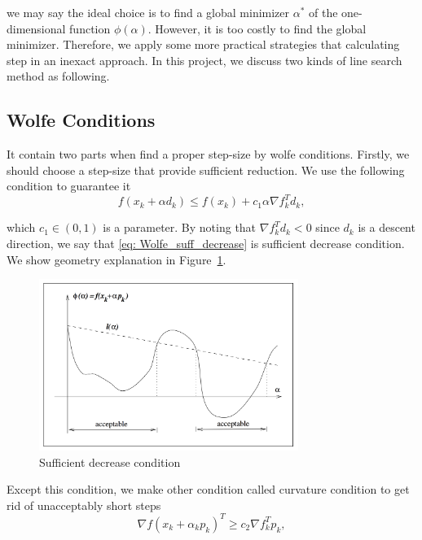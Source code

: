 \documentclass[11pt]{report}
\begin{document}
we may say the ideal choice is to find a global minimizer $\alpha^*$ of the one-dimensional function $\phi(\alpha)$. However, it is too costly to find the global minimizer. Therefore, we apply some more practical strategies that calculating step in an inexact approach. In this project, we discuss two kinds of line search method as following.

\subsection{Wolfe Conditions} %
\label{ssub:wolfe_conditions}

It contain two parts when find a proper step-size by wolfe conditions. Firstly, we should choose a step-size that provide sufficient reduction. We use the following condition to guarantee it
\begin{equation}\label{eq: Wolfe_suff_decrease}
    f(x_k+\alpha d_k) \leq f(x_k) + c_1 \alpha \nabla f_k^Td_k,
\end{equation}

which $c_1\in (0,1)$ is a parameter. By noting that $ \nabla f_k^Td_k<0$ since $d_k$ is a descent direction, we say that \eqref{eq: Wolfe_suff_decrease} is sufficient decrease condition. We show geometry explanation in Figure~\ref{fig: Wolfe_suff_decrease}.

\begin{figure}[H]
    \centering
    \includegraphics[width=0.75\textwidth]{../images/wolfe1} 
    \caption{Sufficient decrease condition}
    \label{fig: Wolfe_suff_decrease}
\end{figure}

Except this condition, we make other condition called curvature condition to get rid of unacceptably short steps
\begin{equation}\label{eq:wolfe_curvature}
    \nabla f(x_k+\alpha_k p_k)^T \geq c_2 \nabla f_k^Tp_k,
 \end{equation}
\end{document}
